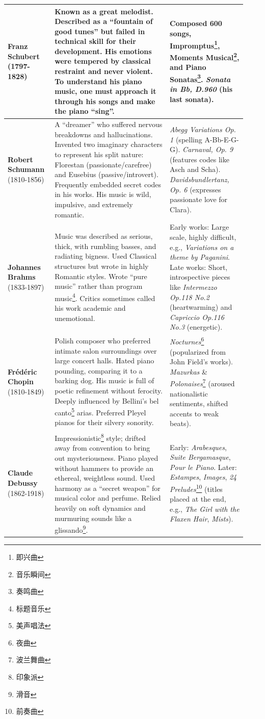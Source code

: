 \documentclass[math,code]{amznotes}
\theoremstyle{remark}
\begin{document}
\begin{longtable}{|p{0.18\linewidth}|p{0.45\linewidth}|p{0.3\linewidth}|}
\textbf{Franz Schubert} (1797-1828) & Known as a great melodist. Described as a ``fountain of good tunes'' but failed in technical skill for their development. His emotions were tempered by classical restraint and never violent. To understand his piano music, one must approach it through his songs and make the piano ``sing''. & Composed 600 songs, Impromptus\footnote{即兴曲}, Moments Musical\footnote{音乐瞬间}, and Piano Sonatas\footnote{奏鸣曲}. \textit{Sonata in Bb, D.960} (his last sonata). \\
\hline
\textbf{Robert Schumann} (1810-1856) & A ``dreamer'' who suffered nervous breakdowns and hallucinations. Invented two imaginary characters to represent his split nature: Florestan (passionate/carefree) and Eusebius (passive/introvert). Frequently embedded secret codes in his works. His music is wild, impulsive, and extremely romantic. & \textit{Abegg Variations Op. 1} (spelling A-Bb-E-G-G). \textit{Carnaval, Op. 9} (features codes like Asch and Scha). \textit{Davidsbundlertanz, Op. 6} (expresses passionate love for Clara). \\
\hline
\textbf{Johannes Brahms} (1833-1897) & Music was described as serious, thick, with rumbling basses, and radiating bigness. Used Classical structures but wrote in highly Romantic styles. Wrote ``pure music'' rather than program music\footnote{标题音乐}. Critics sometimes called his work academic and unemotional. & Early works: Large scale, highly difficult, e.g., \textit{Variations on a theme by Paganini}. Late works: Short, introspective pieces like \textit{Intermezzo Op.118 No.2} (heartwarming) and \textit{Capriccio Op.116 No.3} (energetic). \\
\hline
\textbf{Frédéric Chopin} (1810-1849) & Polish composer who preferred intimate salon surroundings over large concert halls. Hated piano pounding, comparing it to a barking dog. His music is full of poetic refinement without ferocity. Deeply influenced by Bellini's bel canto\footnote{美声唱法} arias. Preferred Pleyel pianos for their silvery sonority. & \textit{Nocturnes}\footnote{夜曲} (popularized from John Field's works). \textit{Mazurkas} \& \textit{Polonaises}\footnote{波兰舞曲} (aroused nationalistic sentiments, shifted accents to weak beats). \\
\hline
\textbf{Claude Debussy} (1862-1918) & Impressionistic\footnote{印象派} style; drifted away from convention to bring out mysteriousness. Piano played without hammers to provide an ethereal, weightless sound. Used harmony as a ``secret weapon'' for musical color and perfume. Relied heavily on soft dynamics and murmuring sounds like a glissando\footnote{滑音}. & Early: \textit{Arabesques}, \textit{Suite Bergamasque}, \textit{Pour le Piano}. Later: \textit{Estampes}, \textit{Images}, \textit{24 Preludes}\footnote{前奏曲} (titles placed at the end, e.g., \textit{The Girl with the Flaxen Hair}, \textit{Mists}). \\

\end{longtable}
\end{document}
